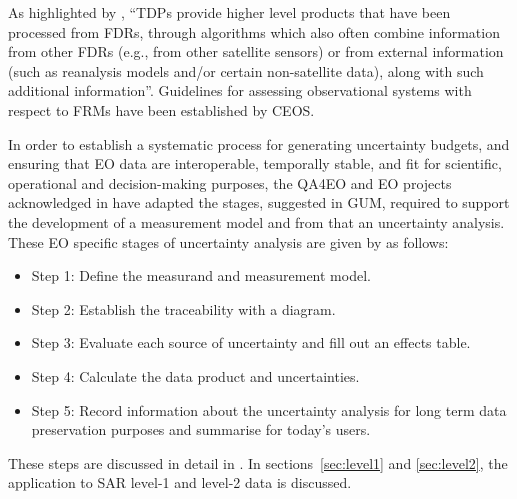 As highlighted by \cite{QA4EO2}, ``\acp{TDP} provide higher level products that
have been processed from \acp{FDR}, through algorithms which also often combine
information from other \acp{FDR} (e.g., from other satellite sensors) or from
external information (such as reanalysis models and/or certain non-satellite
data), along with such additional information''. Guidelines for assessing
observational systems with respect to \acp{FRM} have been established by
\ac{CEOS}.

In order to establish a systematic process for generating uncertainty budgets,
and ensuring that \ac{EO} data are interoperable, temporally stable, and fit
for scientific, operational and decision-making purposes, the \ac{QA4EO} and
\ac{EO} projects acknowledged in \cite{QA4EO3} have adapted the stages,
suggested in \ac{GUM}, required to support the development of a measurement
model and from that an uncertainty analysis. These \ac{EO} specific stages of
uncertainty analysis are given by \cite{QA4EO3} as follows:

\begin{itemize}
  \item Step 1: Define the \gls{measurand} and measurement model.
  \item Step 2: Establish the \gls{traceability} with a diagram.
  \item Step 3: Evaluate each source of uncertainty and fill out an effects table.
  \item Step 4: Calculate the data product and uncertainties.
  \item Step 5: Record information about the \gls{uncertainty analysis} for long term data preservation purposes and summarise for today's users.
\end{itemize}

These steps are discussed in detail in \cite{QA4EO3}. In
sections~\ref{sec:level1} and \ref{sec:level2}, the application to SAR
level-1 and level-2 data is discussed.

